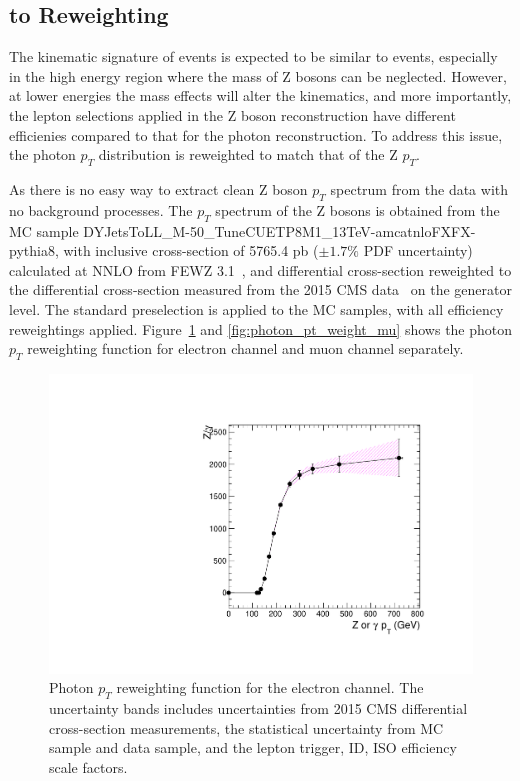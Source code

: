 \subsection{ to  Reweighting}\label{sec:bg_gjetpt}
The kinematic signature of \gjets events is expected to be similar to \Zjets events, especially in the high energy region where the mass of Z bosons can be neglected. However, at lower energies the mass effects will alter the kinematics, and more importantly, the lepton selections applied in the Z boson reconstruction have different efficienies compared to that for the photon reconstruction. To address this issue, the photon $p_T$ distribution is reweighted to match that of the Z $p_T$. 

\vspace{0.3cm}
As there is no easy way to extract clean Z boson $p_T$ spectrum from the data with no background processes. The $p_T$ spectrum of the Z bosons is obtained from the MC sample DYJetsToLL\_M-50\_TuneCUETP8M1\_13TeV-amcatnloFXFX-pythia8, with inclusive cross-section of 5765.4 pb ($\pm 1.7\%$ PDF uncertainty) calculated at NNLO from FEWZ 3.1~\cite{bg_fewz}, and differential cross-section reweighted to the \Zjets differential cross-section measured from the 2015 CMS data~\cite{bg_2015zjetxsec} on the generator level. The standard preselection is applied to the MC samples, with all efficiency reweightings applied. Figure~\ref{fig:photon_pt_weight_el} and \ref{fig:photon_pt_weight_mu} shows the photon $p_T$ reweighting function for electron channel and muon channel separately. 

\begin{figure}[htbp]
\centering
  \includegraphics[width=0.9\linewidth]{figures/study_gjets_data_allcorV2_modify_el.pdf}
  \caption{Photon $p_T$ reweighting function for the electron channel.
 The uncertainty bands includes uncertainties from 2015 CMS \Zjets differential cross-section measurements, the statistical uncertainty from \Zjets MC sample and \gjets data sample, and the lepton trigger, ID, ISO efficiency scale factors.}
  \label{fig:photon_pt_weight_el}
\end{figure}

